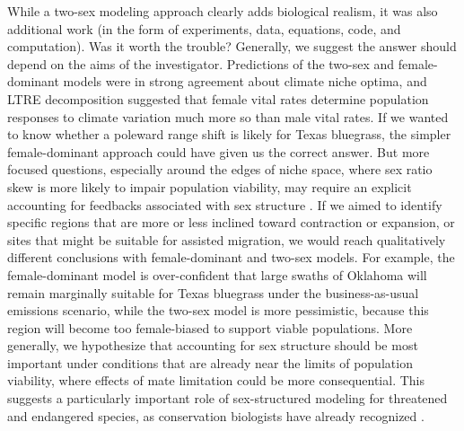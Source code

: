 \documentclass[9pt,twocolumn,twoside,lineno]{pnas-new}
\newcommand{\revise}[1]{{\color{Mahogany}{#1}}}
\begin{document}
While a two-sex modeling approach clearly adds biological realism, it was also additional work (in the form of experiments, data, equations, code, and computation). 
Was it worth the trouble? 
Generally, we suggest the answer should depend on the aims of the investigator. 
Predictions of the two-sex and female-dominant models were in strong agreement about climate niche optima, and LTRE decomposition suggested that female vital rates determine population responses to climate variation much more so than male vital rates. 
If we wanted to know whether a poleward range shift is likely for Texas bluegrass, the simpler female-dominant approach could have given us the correct answer. 
\revise{This is potentially good news given the high data demands of the two-sex model, especially in conservation settings where decisions need to be made with sparse data.}
But more focused questions, especially around the edges of niche space, where sex ratio skew is more likely to impair population viability, may require an explicit accounting for feedbacks associated with sex structure \revise{\citep{eberhart2017sex}}. 
If we aimed to identify specific regions that are more or less inclined toward contraction or expansion, or sites that might be suitable for assisted migration, we would reach qualitatively different conclusions with female-dominant and two-sex models. 
For example, the female-dominant model is over-confident that large swaths of Oklahoma will remain marginally suitable for Texas bluegrass under the business-as-usual emissions scenario, while the two-sex model is more pessimistic, because this region will become too female-biased to support viable populations. 
More generally, we hypothesize that accounting for sex structure should be most important under conditions that are already near the limits of population viability, where effects of mate limitation could be more consequential. 
This suggests a particularly important role of sex-structured modeling for threatened and endangered species, as conservation biologists have already recognized 
 \citep[e.g.,][] {jenouvrier2012effects}.
\end{document}
